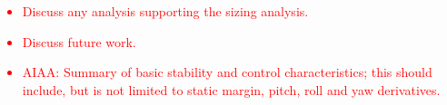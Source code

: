 

\textcolor{red}{
\begin{itemize}
    \item Discuss any analysis supporting the sizing analysis.
    \item Discuss future work.
    \item AIAA: Summary of basic stability and control characteristics; this should include, but is not
    limited to static margin, pitch, roll and yaw derivatives.
\end{itemize}}